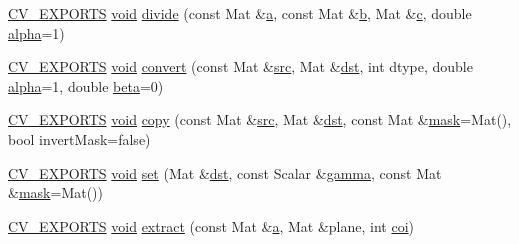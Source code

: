 \begin{DoxyCompactItemize}
\item 
\hyperlink{core_2types__c_8h_a1bf9f0e121b54272da02379cfccd0a2b}{C\-V\-\_\-\-E\-X\-P\-O\-R\-T\-S} \hyperlink{legacy_8hpp_a8bb47f092d473522721002c86c13b94e}{void} \hyperlink{namespacecvtest_a801eea4b4b3c00fe00d9640456ebd275}{divide} (const Mat \&\hyperlink{legacy_8hpp_a1031d0e0a97a340abfe0a6ab9e831045}{a}, const Mat \&\hyperlink{legacy_8hpp_ac04272e8ca865b8fba18d36edae9fd2a}{b}, Mat \&\hyperlink{legacy_8hpp_a1971420173e06f45845eed2ab4e3d5d0}{c}, double \hyperlink{legacy_8hpp_a95fc8341ca418bc06b36160632af6d47}{alpha}=1)
\item 
\hyperlink{core_2types__c_8h_a1bf9f0e121b54272da02379cfccd0a2b}{C\-V\-\_\-\-E\-X\-P\-O\-R\-T\-S} \hyperlink{legacy_8hpp_a8bb47f092d473522721002c86c13b94e}{void} \hyperlink{namespacecvtest_a0c5ec616590629900e1e7178a05701dd}{convert} (const Mat \&\hyperlink{legacy_8hpp_a371cd109b74033bc4366f584edd3dacc}{src}, Mat \&\hyperlink{photo__c_8h_aed13e2a25279b24dc954073233fef7a5}{dst}, int dtype, double \hyperlink{legacy_8hpp_a95fc8341ca418bc06b36160632af6d47}{alpha}=1, double \hyperlink{legacy_8hpp_af8b31eb489dfbd87f3b1a1925cca3589}{beta}=0)
\item 
\hyperlink{core_2types__c_8h_a1bf9f0e121b54272da02379cfccd0a2b}{C\-V\-\_\-\-E\-X\-P\-O\-R\-T\-S} \hyperlink{legacy_8hpp_a8bb47f092d473522721002c86c13b94e}{void} \hyperlink{namespacecvtest_aa0fc2ccf37b3852803f075fd741e536f}{copy} (const Mat \&\hyperlink{legacy_8hpp_a371cd109b74033bc4366f584edd3dacc}{src}, Mat \&\hyperlink{photo__c_8h_aed13e2a25279b24dc954073233fef7a5}{dst}, const Mat \&\hyperlink{tracking_8hpp_a6b13ecd2fd6ec7ad422f1d7863c3ad19}{mask}=Mat(), bool invert\-Mask=false)
\item 
\hyperlink{core_2types__c_8h_a1bf9f0e121b54272da02379cfccd0a2b}{C\-V\-\_\-\-E\-X\-P\-O\-R\-T\-S} \hyperlink{legacy_8hpp_a8bb47f092d473522721002c86c13b94e}{void} \hyperlink{namespacecvtest_a3ea16e468a830d72142a851c48efe630}{set} (Mat \&\hyperlink{photo__c_8h_aed13e2a25279b24dc954073233fef7a5}{dst}, const Scalar \&\hyperlink{legacy_8hpp_a977df9847c7e455667f9fdaa49fbaa11}{gamma}, const Mat \&\hyperlink{tracking_8hpp_a6b13ecd2fd6ec7ad422f1d7863c3ad19}{mask}=Mat())
\item 
\hyperlink{core_2types__c_8h_a1bf9f0e121b54272da02379cfccd0a2b}{C\-V\-\_\-\-E\-X\-P\-O\-R\-T\-S} \hyperlink{legacy_8hpp_a8bb47f092d473522721002c86c13b94e}{void} \hyperlink{namespacecvtest_ac7b8597cdafba6cbe9c627e415fd199a}{extract} (const Mat \&\hyperlink{legacy_8hpp_a1031d0e0a97a340abfe0a6ab9e831045}{a}, Mat \&plane, int \hyperlink{core__c_8h_a77674fb914cf2e14c0ddff790b225dbe}{coi})

\end{DoxyCompactItemize}

